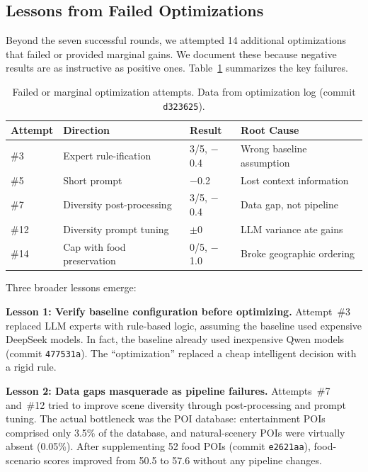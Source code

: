 \subsection{Lessons from Failed Optimizations}

Beyond the seven successful rounds, we attempted 14 additional optimizations that failed or provided marginal gains. We document these because negative results are as instructive as positive ones. Table~\ref{tab:failed_opts} summarizes the key failures.

\begin{table}[H]
\centering
\caption{Failed or marginal optimization attempts. Data from optimization log (commit \texttt{d323625}).}
\label{tab:failed_opts}
\begin{tabular}{@{}llll@{}}
\toprule
\textbf{Attempt} & \textbf{Direction} & \textbf{Result} & \textbf{Root Cause} \\
\midrule
\#3 & Expert rule-ification & 3/5, $-$0.4 & Wrong baseline assumption \\
\#5 & Short prompt & $-$0.2 & Lost context information \\
\#7 & Diversity post-processing & 3/5, $-$0.4 & Data gap, not pipeline \\
\#12 & Diversity prompt tuning & $\pm$0 & LLM variance ate gains \\
\#14 & Cap with food preservation & 0/5, $-$1.0 & Broke geographic ordering \\
\bottomrule
\end{tabular}
\end{table}

Three broader lessons emerge:

\textbf{Lesson 1: Verify baseline configuration before optimizing.} Attempt~\#3 replaced LLM experts with rule-based logic, assuming the baseline used expensive DeepSeek models. In fact, the baseline already used inexpensive Qwen models (commit \texttt{477531a}). The ``optimization'' replaced a cheap intelligent decision with a rigid rule.

\textbf{Lesson 2: Data gaps masquerade as pipeline failures.} Attempts~\#7 and~\#12 tried to improve scene diversity through post-processing and prompt tuning. The actual bottleneck was the POI database: entertainment POIs comprised only 3.5\% of the database, and natural-scenery POIs were virtually absent (0.05\%). After supplementing 52 food POIs (commit \texttt{e2621aa}), food-scenario scores improved from 50.5 to 57.6 without any pipeline changes.

